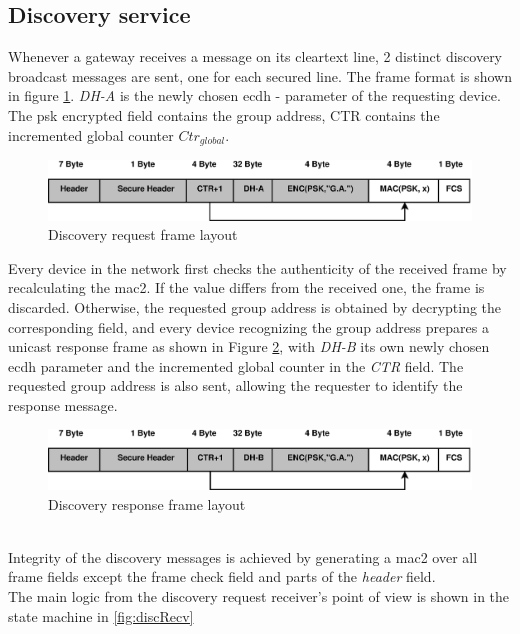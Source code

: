 \subsection{Discovery service}
Whenever a gateway receives a message on its cleartext line, 2 distinct discovery broadcast messages are sent, one for each secured line. 
The frame format is shown in 
figure \ref{fig:discReqFormat}. \textit{DH-A} is the newly chosen \gls{ecdh} - parameter of the requesting device.
The \gls{psk} encrypted field contains the group address, CTR contains the incremented global counter $Ctr_{global}$.
\begin{figure}
  \centering
    \includegraphics[width=1\textwidth]{figures/formatDiscReq.eps}
 \caption{Discovery request frame layout}
 \label{fig:discReqFormat}
\end{figure}
Every device in the network first checks the authenticity of the received frame by recalculating the \gls{mac2}. If the value differs from the received one, the frame
is discarded. Otherwise, the requested group address is obtained by decrypting the corresponding field, and 
every device recognizing the group address prepares a unicast response frame as shown in Figure \ref{fig:discResFormat}, 
with \textit{DH-B} its own newly chosen \gls{ecdh} parameter and the incremented global counter in the \textit{CTR} field. The requested group address is also
sent, allowing the requester to identify the response message.
\begin{figure}
  \centering
    \includegraphics[width=1\textwidth]{figures/formatDiscResp.eps}
 \caption{Discovery response frame layout}
 \label{fig:discResFormat}
\end{figure}
\\
Integrity of the discovery messages is achieved by generating a \gls{mac2} over all frame fields except the frame check field and parts of the \textit{header}
field.
\\
The main logic from the discovery request receiver's point of view is shown in the state machine in \ref{fig:discRecv}

